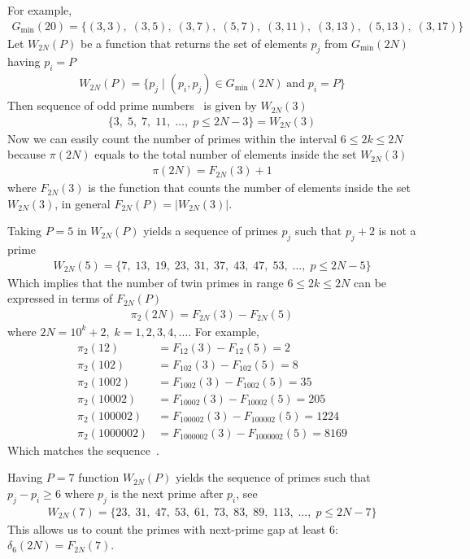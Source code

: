 For example,
\begin{align*}
    G_{\min}(20) = \{
    (3,3),\;
    (3,5),\;
    (3,7),\;
    (5,7),\;
    (3,11),\;
    (3,13),\;
    (5,13),\;
    (3,17)
    \}
\end{align*}
Let $W_{2N}(P)$ be a function that returns the set of elements $p_j$ from $G_{\min} (2N)$ having $p_i=P$
\begin{align*}
    W_{2N}(P) = \{p_j \mid (p_i, p_j) \in G_{\min} (2N) \; \mathrm{and} \; p_i = P \}
\end{align*}
Then sequence of odd prime numbers~\cite{oeis:A065091} is given by $W_{2N}(3)$
\begin{align*}
    \{ 3, \; 5, \; 7, \; 11, \; \dots, \; p \leq 2N - 3\} = W_{2N}(3)
\end{align*}
Now we can easily count the number of primes within the interval $6 \leq 2k \leq 2N$ because $\pi(2N)$ equals to
the total number of elements inside the set $W_{2N}(3)$
\begin{align*}
    \pi(2N) = F_{2N}(3) + 1
\end{align*}
where $F_{2N}(3)$ is the function that counts the number of elements inside the set $W_{2N}(3)$,
in general $F_{2N}(P) = |W_{2N}(3)|$.

Taking $P=5$ in $W_{2N}(P)$ yields a sequence of primes $p_j$ such that $p_j+2$ is not a prime~\cite{oeis:A049591}
\begin{align*}
    W_{2N}(5) = \{ 7, \; 13, \; 19, \; 23, \; 31, \; 37, \; 43, \; 47, \; 53, \; \dots, \;  p \leq 2N - 5 \}
\end{align*}
Which implies that the number of twin primes in range $6 \leq 2k \leq 2N$ can be expressed in terms of $F_{2N}(P)$
\begin{align*}
    \pi_2 (2N) = F_{2N}(3) - F_{2N}(5)
\end{align*}
where $2N=10^k+2, \; k=1,2,3,4,\dots$.
For example,
\begin{align*}
    \pi_2 (12) &= F_{12}(3) - F_{12}(5) = 2 \\
    \pi_2 (102) &= F_{102}(3) - F_{102}(5) = 8 \\
    \pi_2 (1002) &= F_{1002}(3) - F_{1002}(5) = 35 \\
    \pi_2 (10002) &= F_{10002}(3) - F_{10002}(5) = 205 \\
    \pi_2 (100002) &= F_{100002}(3) - F_{100002}(5) = 1224 \\
    \pi_2 (1000002) &= F_{1000002}(3) - F_{1000002}(5) = 8169
\end{align*}
Which matches the sequence~\cite{oeis_A007508}.

Having $P=7$ function $W_{2N}(P)$ yields the sequence of primes such that $p_j-p_i \geq 6$
where $p_j$ is the next prime after $p_i$, see~\cite{oeis:A124582}
\begin{align*}
    W_{2N}(7) = \{ 23, \; 31, \;  47, \; 53, \; 61, \;  73, \; 83, \; 89, \; 113, \; \dots, \; p \leq 2N-7 \}
\end{align*}
This allows us to count the primes with next-prime gap at least 6: $\delta_6(2N) = F_{2N}(7)$.
